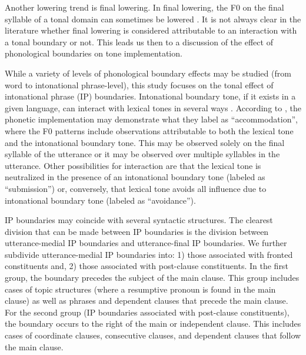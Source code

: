 \documentclass[
  11pt,
  b5paper,
]{article}
\begin{document}
Another lowering trend is final lowering. In final lowering, the F0 on
the final syllable of a tonal domain can sometimes be lowered
\autocite{Herman1996Final,pierrehumbert_japanese_1988}. It is not always
clear in the literature whether final lowering is considered
attributable to an interaction with a tonal boundary or not. This leads
us then to a discussion of the effect of phonological boundaries on tone
implementation.

While a variety of levels of phonological boundary effects may be
studied (from word to intonational phrase-level), this study focuses on
the tonal effect of intonational phrase (IP) boundaries. Intonational
boundary tone, if it exists in a given language, can interact with
lexical tones in several ways
\autocite{Downing2017Introduction,hyman_tonal_2011,downing_intonation_2017-1}.
According to \textcite{hyman_tonal_2011}, the phonetic implementation
may demonstrate what they label as ``accommodation'', where the F0
patterns include observations attributable to both the lexical tone and
the intonational boundary tone. This may be observed solely on the final
syllable of the utterance or it may be observed over multiple syllables
in the utterance. Other possibilities for interaction are that the
lexical tone is neutralized in the presence of an intonational boundary
tone (labeled as ``submission'') or, conversely, that lexical tone
avoids all influence due to intonational boundary tone (labeled as
``avoidance'').

IP boundaries may coincide with several syntactic structures. The
clearest division that can be made between IP boundaries is the division
between utterance-medial IP boundaries and utterance-final IP
boundaries. We further subdivide utterance-medial IP boundaries into: 1)
those associated with fronted constituents and, 2) those associated with
post-clause constituents. In the first group, the boundary precedes the
subject of the main clause. This group includes cases of topic
structures (where a resumptive pronoun is found in the main clause) as
well as phrases and dependent clauses that precede the main clause. For
the second group (IP boundaries associated with post-clause
constituents), the boundary occurs to the right of the main or
independent clause. This includes cases of coordinate clauses,
consecutive clauses, and dependent clauses that follow the main clause.
\end{document}
